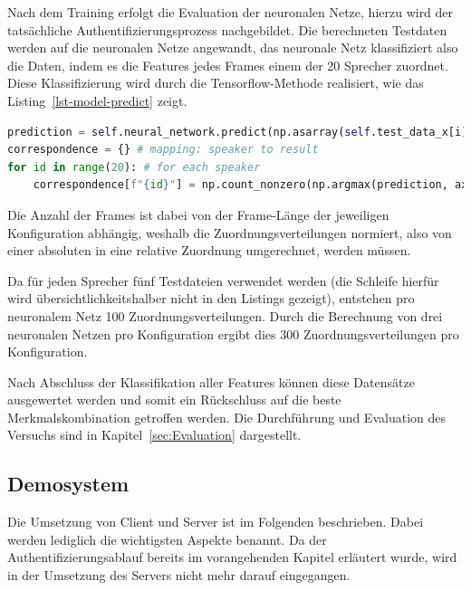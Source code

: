 Nach dem Training erfolgt die Evaluation der neuronalen Netze, hierzu wird der tatsächliche Authentifizierungsprozess nachgebildet.
Die berechneten Testdaten werden auf die neuronalen Netze angewandt, das neuronale Netz klassifiziert also die Daten, indem es die Features jedes Frames einem der 20 Sprecher zuordnet.
Diese Klassifizierung wird durch die Tensorflow-Methode  realisiert, wie das Listing~\ref{lst-model-predict} zeigt.

\begin{lstlisting}[language=Python,numbers=none,caption=Evaluation mit model.predict und Normalisierung des Ergebnisses,label=lst-model-predict]
prediction = self.neural_network.predict(np.asarray(self.test_data_x[i])) # generate prediction for the sample
correspondence = {} # mapping: speaker to result
for id in range(20): # for each speaker
    correspondence[f"{id}"] = np.count_nonzero(np.argmax(prediction, axis=1) == id) / len(prediction) # normalization
\end{lstlisting}

Die Anzahl der Frames ist dabei von der Frame-Länge der jeweiligen Konfiguration abhängig, weshalb die Zuordnungsverteilungen normiert, also von einer absoluten in eine relative Zuordnung umgerechnet, werden müssen.

Da für jeden Sprecher fünf Testdateien verwendet werden (die Schleife hierfür wird übersichtlichkeitshalber nicht in den Listings gezeigt), entstehen pro neuronalem Netz 100 Zuordnungsverteilungen.
Durch die Berechnung von drei neuronalen Netzen pro Konfiguration ergibt dies 300 Zuordnungsverteilungen pro Konfiguration.

Nach Abschluss der Klassifikation aller Features können diese Datensätze ausgewertet werden und somit ein Rückschluss auf die beste Merkmalskombination getroffen werden.
Die Durchführung und Evaluation des Versuchs sind in Kapitel~\ref{sec:Evaluation} dargestellt.

\subsection{Demosystem}
Die Umsetzung von Client und Server ist im Folgenden beschrieben.
Dabei werden lediglich die wichtigsten Aspekte benannt.
Da der Authentifizierungsablauf bereits im vorangehenden Kapitel erläutert wurde, wird in der Umsetzung des Servers nicht mehr darauf eingegangen.

